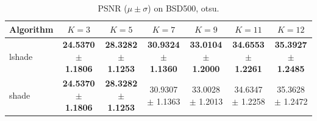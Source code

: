 \begin{table}[htbp]
\centering
\caption{PSNR ($\mu \pm \sigma$) on BSD500, otsu.}
\label{tab:exp1-otsu-psnr}
\begin{tabular}{lcccccc}
\toprule
Algorithm & $K=3$ & $K=5$ & $K=7$ & $K=9$ & $K=11$ & $K=12$ \\
\midrule
lshade & \textbf{24.5370 $\pm$ 1.1806} & \textbf{28.3282 $\pm$ 1.1253} & \textbf{30.9324 $\pm$ 1.1360} & \textbf{33.0104 $\pm$ 1.2000} & \textbf{34.6553 $\pm$ 1.2261} & \textbf{35.3927 $\pm$ 1.2485} \\
shade & \textbf{24.5370 $\pm$ 1.1806} & \textbf{28.3282 $\pm$ 1.1253} & 30.9307 $\pm$ 1.1363 & 33.0028 $\pm$ 1.2013 & 34.6347 $\pm$ 1.2258 & 35.3628 $\pm$ 1.2472 \\
\bottomrule
\end{tabular}
\end{table}